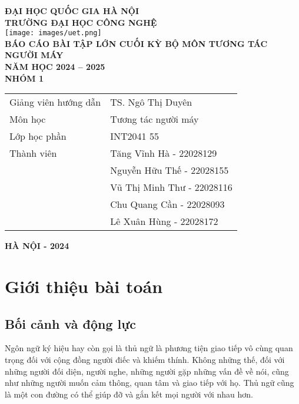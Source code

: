 \documentclass[a4paper,12pt]{article}
\begin{document}
\thispagestyle{empty}


\begin{center}
\changefontsizes{16pt}

	\textbf{ĐẠI HỌC QUỐC GIA HÀ NỘI\\TRƯỜNG ĐẠI HỌC CÔNG NGHỆ}\\[1cm]
	\texttt{[image: images/uet.png]}\\[1cm]
\changefontsizes{14pt}
        \textbf{BÁO CÁO BÀI TẬP LỚN CUỐI KỲ BỘ MÔN TƯƠNG TÁC NGƯỜI MÁY}
        \\
        \textbf{NĂM HỌC 2024 – 2025}
        \\[1cm]
        \textbf{NHÓM 1}
	\\[1cm]
\changefontsizes{13pt}
        \begin{tabular}{l @{\hskip 0.5in} l}
            Giảng viên hướng dẫn & TS. Ngô Thị Duyên \\
            Môn học & Tương tác người máy \\
            Lớp học phần & INT2041 55 \\
            Thành viên & Tăng Vĩnh Hà - 22028129 \\
            & Nguyễn Hữu Thế - 22028155 \\
            & Vũ Thị Minh Thư - 22028116 \\
            & Chu Quang Cần - 22028093 \\
            & Lê Xuân Hùng - 22028172 \\
        \end{tabular}
	\vfill
	\textbf{HÀ NỘI - 2024}
\end{center}
\clearpage

\tableofcontents{}
\clearpage


\section{Giới thiệu bài toán}

\subsection{Bối cảnh và động lực}
Ngôn ngữ ký hiệu hay còn gọi là thủ ngữ là phương tiện giao tiếp vô cùng quan trọng đối với cộng đồng người điếc và khiếm thính. Không những thế, đối với những người đối diện, người nghe, những người gặp những vấn đề về nói, cũng như những người muốn cảm thông, quan tâm và giao tiếp với họ. Thủ ngữ cũng là một con đường có thể giúp đỡ và gắn kết mọi người với nhau hơn.
\end{document}
